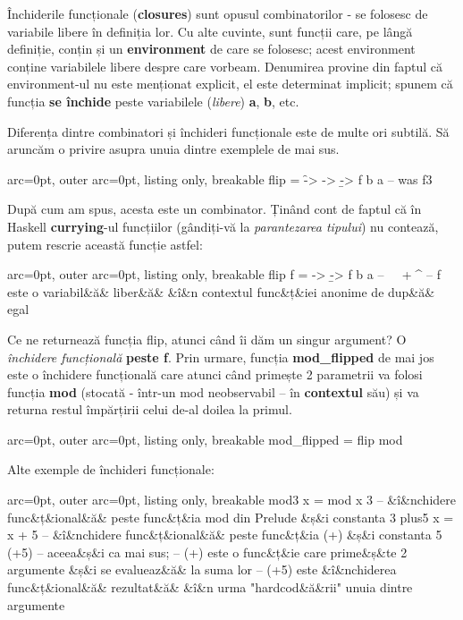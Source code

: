 Închiderile funcționale (\textbf{closures}) sunt opusul combinatorilor - se folosesc de variabile libere în definiția lor.  Cu alte cuvinte, sunt funcții care, pe lângă definiție, conțin și un \textbf{environment} de care se folosesc; acest environment conține variabilele libere despre care vorbeam.  Denumirea provine din faptul că environment-ul nu este menționat explicit, el este determinat implicit; spunem că funcția \textbf{se închide} peste variabilele (\textit{libere}) \textbf{a}, \textbf{b}, etc.  

Diferența dintre combinatori și închideri funcționale este de multe ori subtilă.  Să aruncăm o privire asupra unuia dintre exemplele de mai sus.


\begin{tcblisting}{ arc=0pt, outer arc=0pt, listing only, breakable}
flip = \f -> \a -> \b -> f b a -- was f3

\end{tcblisting}


După cum am spus, acesta este un combinator.  Ținând cont de faptul că în Haskell \textbf{currying}-ul funcțiilor (gândiți-vă la \textit{parantezarea tipului}) nu contează, putem rescrie această funcție astfel:


\begin{tcblisting}{ arc=0pt, outer arc=0pt, listing only, breakable}
flip f = \a -> \b -> f b a
      -- ^^^^^^^^^^^^+^^^^ 
      --     f este o variabil&ă& liber&ă& &î&n contextul func&ț&iei anonime de dup&ă& egal

\end{tcblisting}


Ce ne returnează funcția flip, atunci când îi dăm un singur argument?  O \textit{închidere funcțională} \textbf{peste f}.  Prin urmare, funcția \textbf{mod\_flipped} de mai jos este o închidere funcțională care atunci când primește 2 parametrii va folosi funcția \textbf{mod} (stocată - într-un mod neobservabil -- în \textbf{contextul} său) și va returna restul împărțirii celui de-al doilea la primul.


\begin{tcblisting}{ arc=0pt, outer arc=0pt, listing only, breakable}
mod_flipped = flip mod

\end{tcblisting}


Alte exemple de închideri funcționale:


\begin{tcblisting}{ arc=0pt, outer arc=0pt, listing only, breakable}
mod3 x = mod x 3 -- &î&nchidere func&ț&ional&ă& peste func&ț&ia mod din Prelude &ș&i constanta 3
plus5 x = x + 5  -- &î&nchidere func&ț&ional&ă& peste func&ț&ia (+) &ș&i constanta 5
(+5)             -- aceea&ș&i ca mai sus;
                 --     (+) este o func&ț&ie care prime&ș&te 2 argumente &ș&i se evalueaz&ă& la suma lor
                 --     (+5) este &î&nchiderea func&ț&ional&ă& rezultat&ă& &î&n urma "hardcod&ă&rii" unuia dintre argumente

\end{tcblisting}


